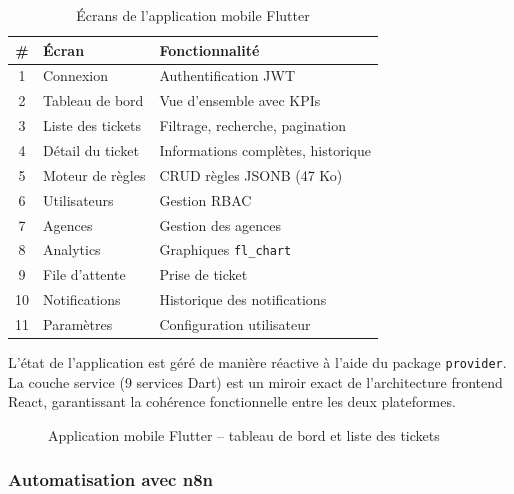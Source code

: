 \begin{table}[H]
\centering
\caption{\'{E}crans de l'application mobile Flutter}
\label{tab:flutter_screens}
\begin{tabular}{|c|p{4cm}|p{6.5cm}|}
\hline
\textbf{\#} & \textbf{\'{E}cran} & \textbf{Fonctionnalit\'{e}} \\
\hline
1 & Connexion & Authentification JWT \\
\hline
2 & Tableau de bord & Vue d'ensemble avec KPIs \\
\hline
3 & Liste des tickets & Filtrage, recherche, pagination \\
\hline
4 & D\'{e}tail du ticket & Informations compl\`{e}tes, historique \\
\hline
5 & Moteur de r\`{e}gles & CRUD r\`{e}gles JSONB (47 Ko) \\
\hline
6 & Utilisateurs & Gestion RBAC \\
\hline
7 & Agences & Gestion des agences \\
\hline
8 & Analytics & Graphiques \texttt{fl\_chart} \\
\hline
9 & File d'attente & Prise de ticket \\
\hline
10 & Notifications & Historique des notifications \\
\hline
11 & Param\`{e}tres & Configuration utilisateur \\
\hline
\end{tabular}
\end{table}

L'\'{e}tat de l'application est g\'{e}r\'{e} de mani\`{e}re r\'{e}active \`{a} l'aide du package \texttt{provider}. La couche service (9 services Dart) est un miroir exact de l'architecture frontend React, garantissant la coh\'{e}rence fonctionnelle entre les deux plateformes.

\begin{figure}[H]
    \centering
    \caption{Application mobile Flutter -- tableau de bord et liste des tickets}
    \label{fig:mobile_app}
\end{figure}

\subsubsection{Automatisation avec n8n}

